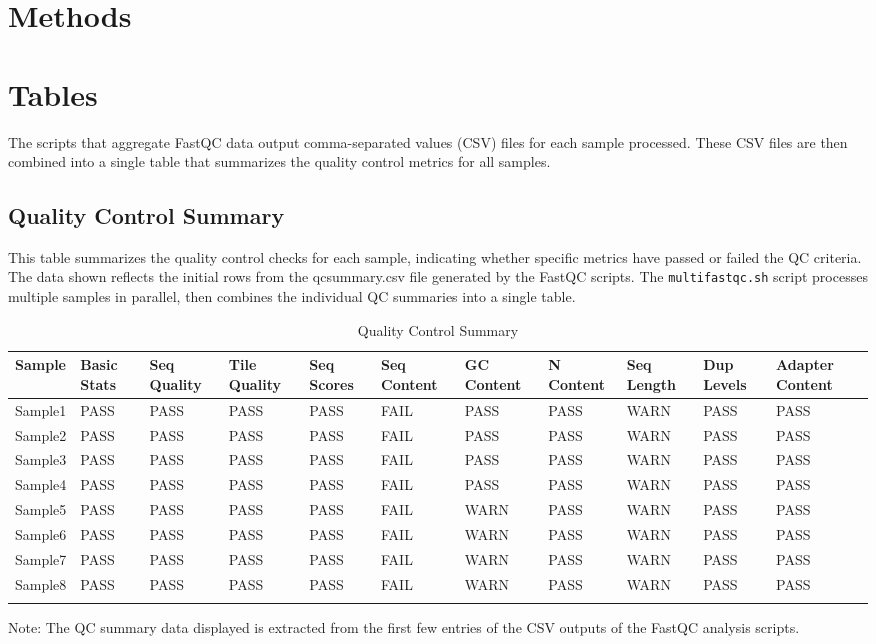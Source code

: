 \documentclass[unnumsec,webpdf,contemporary,large]{oup-authoring-template}%
\theoremstyle{thmstyleone}%
\theoremstyle{thmstyletwo}%
\theoremstyle{thmstylethree}%
\begin{document}
\section{Methods}

\section{Tables}

The scripts that aggregate FastQC data output comma-separated values (CSV) files for each sample processed. These CSV files are then combined into a single table that summarizes the quality control metrics for all samples.

\subsection{Quality Control Summary}

This table summarizes the quality control checks for each sample, indicating whether specific metrics have passed or failed the QC criteria. The data shown reflects the initial rows from the qcsummary.csv file generated by the FastQC scripts. The \texttt{multifastqc.sh} script processes multiple samples in parallel, then combines the individual QC summaries into a single table.

\begin{table}[htbp]
\caption{Quality Control Summary\label{tab1}}
\centering
\begin{tabular}{@{}lllllllllll@{}}
\toprule
Sample & Basic Stats & Seq Quality & Tile Quality & Seq Scores & Seq Content & GC Content & N Content & Seq Length & Dup Levels & Adapter Content \\
\midrule
Sample1 & PASS & PASS & PASS & PASS & FAIL & PASS & PASS & WARN & PASS & PASS \\
Sample2 & PASS & PASS & PASS & PASS & FAIL & PASS & PASS & WARN & PASS & PASS \\
Sample3 & PASS & PASS & PASS & PASS & FAIL & PASS & PASS & WARN & PASS & PASS \\
Sample4 & PASS & PASS & PASS & PASS & FAIL & PASS & PASS & WARN & PASS & PASS \\
Sample5 & PASS & PASS & PASS & PASS & FAIL & WARN & PASS & WARN & PASS & PASS \\
Sample6 & PASS & PASS & PASS & PASS & FAIL & WARN & PASS & WARN & PASS & PASS \\
Sample7 & PASS & PASS & PASS & PASS & FAIL & WARN & PASS & WARN & PASS & PASS \\
Sample8 & PASS & PASS & PASS & PASS & FAIL & WARN & PASS & WARN & PASS & PASS \\
\botrule
\end{tabular}
\begin{tablenotes}%
\item Note: The QC summary data displayed is extracted from the first few entries of the CSV outputs of the FastQC analysis scripts.
\end{tablenotes}
\end{table}
\end{document}
